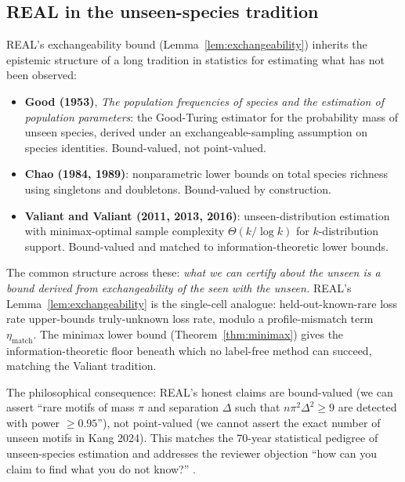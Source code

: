 
\subsection{REAL in the unseen-species tradition}
\label{sec:S1-unseen-species}

REAL's exchangeability bound (Lemma~\ref{lem:exchangeability}) inherits the epistemic structure of a long tradition in statistics for estimating what has not been observed:
\begin{itemize}[leftmargin=*,nosep]
  \item \textbf{Good (1953)}, \textit{The population frequencies of species and the estimation of population parameters}: the Good-Turing estimator for the probability mass of unseen species, derived under an exchangeable-sampling assumption on species identities. Bound-valued, not point-valued.
  \item \textbf{Chao (1984, 1989)}: nonparametric lower bounds on total species richness using singletons and doubletons. Bound-valued by construction.
  \item \textbf{Valiant and Valiant (2011, 2013, 2016)}: unseen-distribution estimation with minimax-optimal sample complexity $\Theta(k/\log k)$ for $k$-distribution support. Bound-valued and matched to information-theoretic lower bounds.
\end{itemize}
The common structure across these: \emph{what we can certify about the unseen is a bound derived from exchangeability of the seen with the unseen.} REAL's Lemma~\ref{lem:exchangeability} is the single-cell analogue: held-out-known-rare loss rate upper-bounds truly-unknown loss rate, modulo a profile-mismatch term $\eta_{\text{match}}$. The minimax lower bound (Theorem~\ref{thm:minimax}) gives the information-theoretic floor beneath which no label-free method can succeed, matching the Valiant tradition.

The philosophical consequence: REAL's honest claims are bound-valued (we can assert ``rare motifs of mass $\pi$ and separation $\Delta$ such that $n\pi^{2}\Delta^{2} \geq 9$ are detected with power $\geq 0.95$''), not point-valued (we cannot assert the exact number of unseen motifs in Kang 2024). This matches the 70-year statistical pedigree of unseen-species estimation and addresses the reviewer objection ``how can you claim to find what you do not know?'' \citep{good1953,chao1984,valiant2011}.
